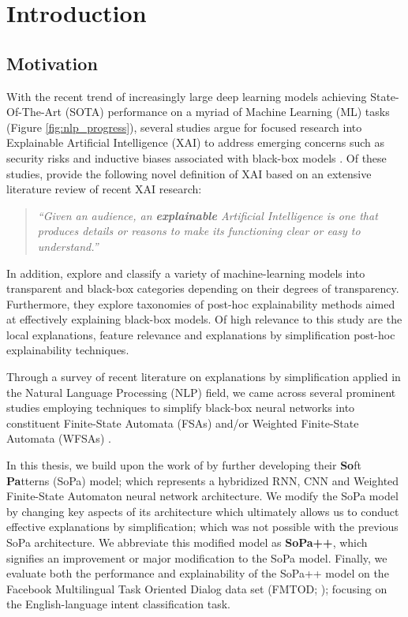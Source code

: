 \chapter{Introduction}

\label{chapter:introduction}

\section{Motivation}

With the recent trend of increasingly large deep learning models achieving State-Of-The-Art (SOTA) performance on a myriad of Machine Learning (ML) tasks (Figure \ref{fig:nlp_progress}), several studies argue for focused research into Explainable Artificial Intelligence (XAI) to address emerging concerns such as security risks and inductive biases associated with black-box models \citep{doran2017does,townsend2019extracting,danilevsky2020survey,arrieta2020explainable}. Of these studies, \citet[Page 4, Section 2.2]{arrieta2020explainable} provide the following novel definition of XAI based on an extensive literature review of recent XAI research:

\begin{quote}
  \textit{``Given an audience, an \textbf{explainable} Artificial Intelligence is one that produces details or reasons to make its functioning clear or easy to understand.''}
\end{quote}

In addition, \citet{arrieta2020explainable} explore and classify a variety of machine-learning models into transparent and black-box categories depending on their degrees of transparency. Furthermore, they explore taxonomies of post-hoc explainability methods aimed at effectively explaining black-box models. Of high relevance to this study are the local explanations, feature relevance and explanations by simplification post-hoc explainability techniques. 

Through a survey of recent literature on explanations by simplification applied in the Natural Language Processing (NLP) field, we came across several prominent studies employing techniques to simplify black-box neural networks into constituent Finite-State Automata (FSAs) and/or Weighted Finite-State Automata (WFSAs) \citep{schwartz2018sopa,peng2018rational,DBLP:journals/corr/abs-1905-08701,wang2019state,jiang2020cold}.

In this thesis, we build upon the work of \citet{schwartz2018sopa} by further developing their \textbf{So}ft \textbf{Pa}tterns (SoPa) model; which represents a hybridized RNN, CNN and Weighted Finite-State Automaton neural network architecture. We modify the SoPa model by changing key aspects of its architecture which ultimately allows us to conduct effective explanations by simplification; which was not possible with the previous SoPa architecture. We abbreviate this modified model as \textbf{SoPa++}, which signifies an improvement or major modification to the SoPa model. Finally, we evaluate both the performance and explainability of the SoPa++ model on the Facebook Multilingual Task Oriented Dialog data set (FMTOD; \citealt{schuster-etal-2019-cross-lingual}); focusing on the English-language intent classification task.

